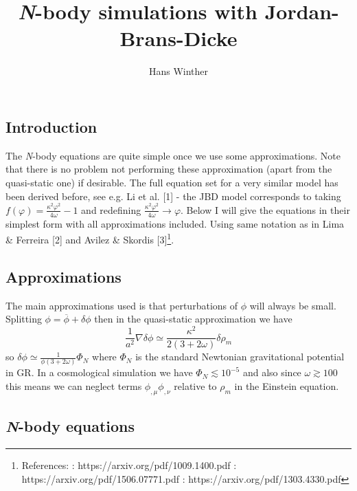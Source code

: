 \documentclass[usenatbib]{article}
\title{{\it N}-body simulations with Jordan-Brans-Dicke}
\author{Hans Winther}
\begin{document}
\maketitle

\subsection*{Introduction}

The {\it N}-body equations are quite simple once we use some approximations. Note that there is no problem not performing these approximation (apart from the quasi-static one) if desirable. The full equation set for a very similar model has been derived before, see e.g. Li et al. [1] - the JBD model corresponds to taking $f(\varphi) = \frac{\kappa^2\varphi^2}{4\omega} - 1$ and redefining $\frac{\kappa^2\varphi^2}{4\omega} \to \varphi$. Below I will give the equations in their simplest form with all approximations included. Using same notation as in Lima \& Ferreira [2] and Avilez \& Skordis [3]\footnote{References: \newline [1]: https://arxiv.org/pdf/1009.1400.pdf \newline [2]: https://arxiv.org/pdf/1506.07771.pdf \newline [3]: https://arxiv.org/pdf/1303.4330.pdf }.

\subsection*{Approximations}

The main approximations used is that perturbations of $\phi$ will always be small. Splitting $\phi = \overline{\phi} + \delta\phi$ then in the quasi-static approximation we have
$$\frac{1}{a^2}\nabla\delta\phi \simeq \frac{\kappa^2}{2(3+2\omega)}\delta\rho_m$$
so $\delta\phi \simeq \frac{1}{\phi(3+2\omega)}\Phi_N$ where $\Phi_N$ is the standard Newtonian gravitational potential in GR. In a cosmological simulation we have $\Phi_N \lesssim 10^{-5}$ and also since $\omega\gtrsim 100$ this means we can neglect terms $\phi_{,\mu}\phi_{,\nu}$ relative to $\rho_m$ in the Einstein equation.

\subsection*{{\it N}-body equations}
\end{document}

